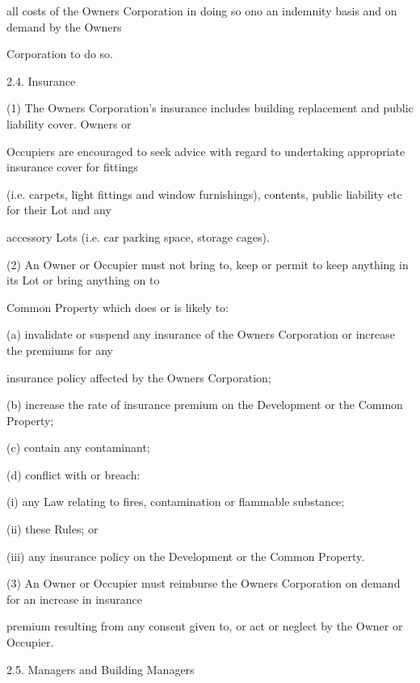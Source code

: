 \documentclass{article}
\begin{document}
{\fontsize{10.02}{1}all costs of the Owners Corporation in doing so ono an indemnity basis and on demand by the Owners }

{\fontsize{10.02}{1}Corporation to do so. }

\newpage

{\fontsize{9.99}{1}2.4. Insurance }

{\fontsize{9.962}{1}(1) The Owners Corporation’s insurance includes building replacement and public liability cover. Owners or }

{\fontsize{10.02}{1}Occupiers are encouraged to seek advice with regard to undertaking appropriate insurance cover for fittings }

{\fontsize{10.02}{1}(i.e. carpets, light fittings and window furnishings), contents, public liability etc for their Lot and any }

{\fontsize{10.02}{1}accessory Lots (i.e. car parking space, storage cages). }

{\fontsize{9.962}{1}(2) An Owner or Occupier must not bring to, keep or permit to keep anything in its Lot or bring anything on to }

{\fontsize{10.02}{1}Common Property which does or is likely to: }

{\fontsize{9.962}{1}(a) invalidate or suspend any insurance of the Owners Corporation or increase the premiums for any }

{\fontsize{10.02}{1}insurance policy affected by the Owners Corporation; }

{\fontsize{9.962}{1}(b) increase the rate of insurance premium on the Development or the Common Property; }

{\fontsize{9.962}{1}(c) contain any contaminant; }

{\fontsize{9.962}{1}(d) conflict with or breach: }

{\fontsize{9.962}{1}(i) any Law relating to fires, contamination or flammable substance; }

{\fontsize{9.962}{1}(ii) these Rules; or }

{\fontsize{9.962}{1}(iii) any insurance policy on the Development or the Common Property. }

{\fontsize{9.962}{1}(3) An Owner or Occupier must reimburse the Owners Corporation on demand for an increase in insurance }

{\fontsize{10.02}{1}premium resulting from any consent given to, or act or neglect by the Owner or Occupier. }

{\fontsize{9.99}{1}2.5. Managers and Building Managers }
\end{document}
